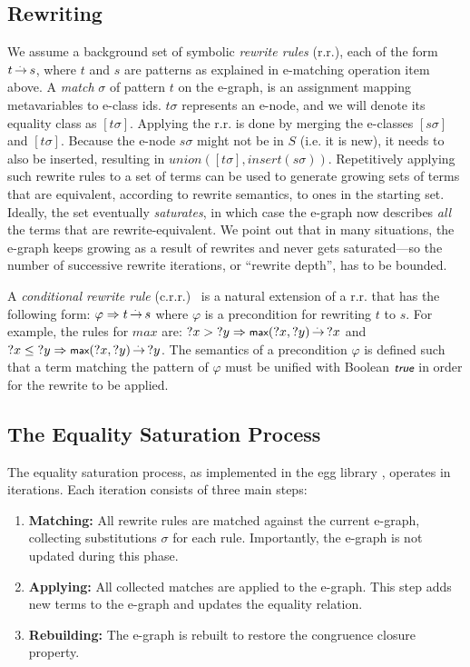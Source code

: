 \subsection{Rewriting}
We assume a background set of symbolic \emph{rewrite rules} (r.r.), each of the form $t\operatorname{\overset{.\,}{\rightarrow}} s$,
where $t$ and $s$ are patterns as explained in e-matching operation item above.
A \emph{match} $\sigma$ of pattern $t$ on the e-graph, is an assignment mapping metavariables to e-class ids.
$t\sigma$ represents an e-node, and we will denote its equality class as $[t\sigma]$.
Applying the r.r. is done by merging the e-classes $[s\sigma]$ and $[t\sigma]$. 
Because the e-node $s\sigma$ might not be in $S$ (i.e. it is new), it needs to also be inserted, resulting in $union([t\sigma], insert(s\sigma))$.
Repetitively applying such rewrite rules to a set of terms can be used to generate growing sets of terms that are equivalent, according to rewrite semantics, to ones in the starting set.
Ideally, the set eventually \emph{saturates}, in which case the e-graph now describes \emph{all} the
terms that are rewrite-equivalent.
We point out that in many situations, the e-graph keeps growing as a result of rewrites and never gets saturated---so the number of successive rewrite iterations, or ``rewrite depth'', has to be bounded.

A \emph{conditional rewrite rule} (c.r.r.)~\cite{jcss/Bergstra} is a natural extension of a r.r. that has the following form:
$\varphi \Rightarrow t \operatorname{\overset{.\,}{\rightarrow}} s$
where $\varphi$ is a precondition for rewriting $t$ to $s$. For example, the rules for $max$ are:
${?x} > {?y} \Rightarrow \tmax({?x}, {?y}) \rwto {?x}$ and 
${?x} \leq {?y} \Rightarrow \tmax({?x}, {?y}) \rwto {?y}$.
%
The semantics of a precondition $\varphi$ is defined such that a term matching the pattern of $\varphi$
must be unified with Boolean $\ttrue$ in order for the rewrite to be applied.

\subsection{The Equality Saturation Process}

The equality saturation process, as implemented in the egg library \cite{egg}, operates in iterations. Each iteration consists of three main steps:

\begin{enumerate}
    \item \textbf{Matching:} All rewrite rules are matched against the current e-graph, collecting substitutions $\sigma$ for each rule. 
    Importantly, the e-graph is not updated during this phase.
    \item \textbf{Applying:} All collected matches are applied to the e-graph. 
    This step adds new terms to the e-graph and updates the equality relation.
    \item \textbf{Rebuilding:} The e-graph is rebuilt to restore the congruence closure property.
\end{enumerate}

